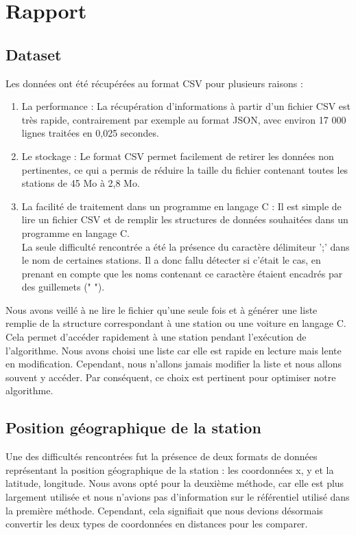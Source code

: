 \documentclass[12pt,titlepage]{report}
\begin{document}
\newpage
\chapter{Rapport}

\section{Dataset}
Les données ont été récupérées au format CSV pour plusieurs raisons :
\begin{enumerate}
    \item La performance : La récupération d'informations à partir d'un fichier CSV est très rapide, contrairement par exemple au format JSON, avec environ 17 000 lignes traitées en 0,025 secondes.
    \item Le stockage : Le format CSV permet facilement de retirer les données non pertinentes, ce qui a permis de réduire la taille du fichier contenant toutes les stations de 45 Mo à 2,8 Mo.
    \item La facilité de traitement dans un programme en langage C : Il est simple de lire un fichier CSV et de remplir les structures de données souhaitées dans un programme en langage C. \\
    La seule difficulté rencontrée a été la présence du caractère délimiteur ';' dans le nom de certaines stations. Il a donc fallu détecter si c'était le cas, en prenant en compte que les noms contenant ce caractère étaient encadrés par des guillemets (" ").
\end{enumerate}

Nous avons veillé à ne lire le fichier qu'une seule fois et à générer une liste remplie de la structure correspondant à une station ou une voiture en langage C. Cela permet d'accéder rapidement à une station pendant l'exécution de l'algorithme. Nous avons choisi une liste car elle est rapide en lecture mais lente en modification. Cependant, nous n'allons jamais modifier la liste et nous allons souvent y accéder. Par conséquent, ce choix est pertinent pour optimiser notre algorithme.

\section{Position géographique de la station}

Une des difficultés rencontrées fut la présence de deux formats de données représentant la position géographique de la station : les coordonnées x, y et la latitude, longitude. Nous avons opté pour la deuxième méthode, car elle est plus largement utilisée et nous n'avions pas d'information sur le référentiel utilisé dans la première méthode. Cependant, cela signifiait que nous devions désormais convertir les deux types de coordonnées en distances pour les comparer. \\ \\ 
\end{document}
